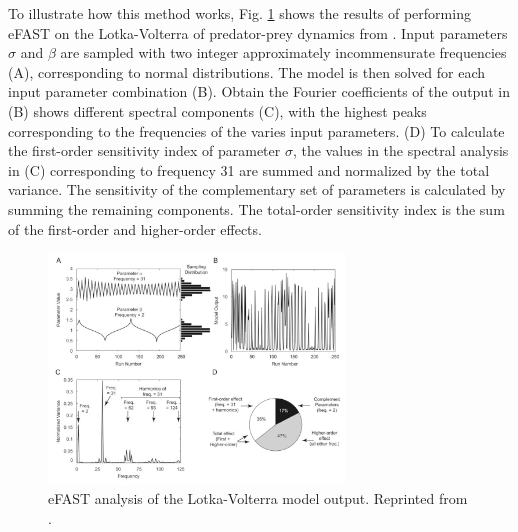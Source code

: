 \documentclass[12pt]{article}
\begin{document}
{\vspace{0.5cm}
To illustrate how this method works, Fig. \ref{fig:FAST} shows the results of performing eFAST on the Lotka-Volterra of predator-prey dynamics from \cite{MARINO}. Input parameters $\sigma$ and $\beta$ are sampled with two integer approximately incommensurate frequencies (A), corresponding to normal distributions. The model is then solved for each input parameter combination (B). Obtain the Fourier coefficients of the output in (B) shows different spectral components (C), with the highest peaks corresponding to the frequencies of the varies input parameters. (D) To calculate the first-order sensitivity index of parameter $\sigma$, the values in the spectral analysis in (C) corresponding to frequency 31 are summed and normalized by the total variance. The sensitivity of the complementary set of parameters is calculated by summing the remaining components. The total-order sensitivity index is the sum of the first-order and higher-order effects. 




\begin{figure}[h]
	\centering
	\includegraphics[width=0.7\textwidth]{images/FAST.png}
	\caption{eFAST analysis of the Lotka-Volterra model output. Reprinted from \cite{MARINO}.}
	\label{fig:FAST}
\end{figure}

}
\end{document}
